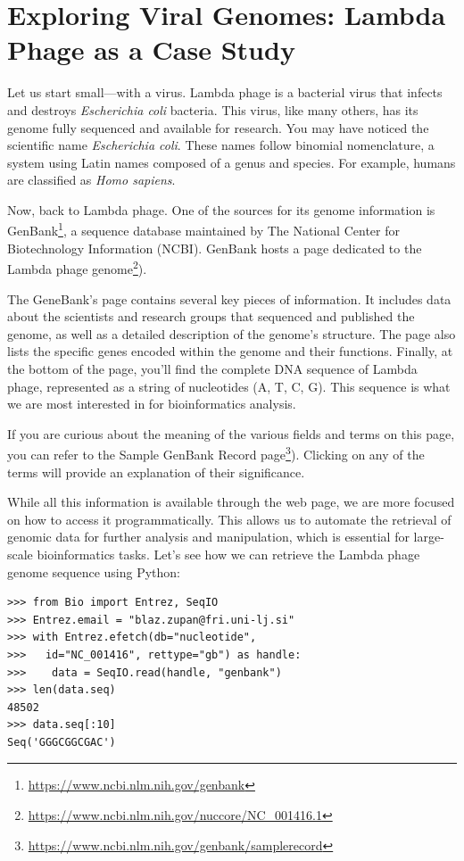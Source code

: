\section{Exploring Viral Genomes: Lambda Phage as a Case Study}

Let us start small—with a virus. Lambda phage is a bacterial virus that infects and destroys \textit{Escherichia coli} bacteria. This virus, like many others, has its genome fully sequenced and available for research. You may have noticed the scientific name \textit{Escherichia coli}. These names follow binomial nomenclature, a system using Latin names composed of a genus and species. For example, humans are classified as \textit{Homo sapiens}.

Now, back to Lambda phage. One of the sources for its genome information is GenBank\footnote{\url{https://www.ncbi.nlm.nih.gov/genbank}}, a sequence database maintained by The National Center for Biotechnology Information (NCBI). GenBank hosts a page dedicated to the Lambda phage genome\footnote{\url{https://www.ncbi.nlm.nih.gov/nuccore/NC_001416.1}}).

The GeneBank's page contains several key pieces of information. It includes data about the scientists and research groups that sequenced and published the genome, as well as a detailed description of the genome’s structure. The page also lists the specific genes encoded within the genome and their functions. Finally, at the bottom of the page, you'll find the complete DNA sequence of Lambda phage, represented as a string of nucleotides (A, T, C, G). This sequence is what we are most interested in for bioinformatics analysis.

If you are curious about the meaning of the various fields and terms on this page, you can refer to the Sample GenBank Record page\footnote{\url{https://www.ncbi.nlm.nih.gov/genbank/samplerecord}}). Clicking on any of the terms will provide an explanation of their significance.

While all this information is available through the web page, we are more focused on how to access it programmatically. This allows us to automate the retrieval of genomic data for further analysis and manipulation, which is essential for large-scale bioinformatics tasks. Let's see how we can retrieve the Lambda phage genome sequence using Python:

\vspace*{3mm}
\begin{lstlisting}
>>> from Bio import Entrez, SeqIO
>>> Entrez.email = "blaz.zupan@fri.uni-lj.si"
>>> with Entrez.efetch(db="nucleotide", 
>>>   id="NC_001416", rettype="gb") as handle:
>>>    data = SeqIO.read(handle, "genbank")
>>> len(data.seq)
48502
>>> data.seq[:10]
Seq('GGGCGGCGAC')
\end{lstlisting}

